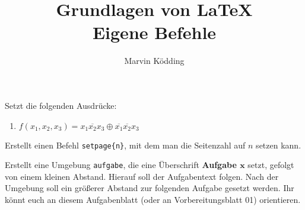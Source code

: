 \documentclass[a4paper, 12pt]{mksheetphhd}
\title{Grundlagen von \LaTeX\\\small Eigene Befehle}
\author{Marvin Ködding}
\begin{document}
	\printtitle
	
	\vspace*{.5cm}
	
	\begin{aufgabe}
		Setzt die folgenden Ausdrücke:
		\begin{enumerate}
				\item $f(x_1, x_2, x_3) = x_1\overline{x_2}x_3 \oplus \overline{x_1}\overline{x_2}x_3$
			
		\end{enumerate}
	\end{aufgabe}
	
	\begin{aufgabe}
		Erstellt einen Befehl \verb|setpage{n}|, mit dem man die Seitenzahl auf $n$ setzen kann.
	\end{aufgabe}
	
	\begin{aufgabe}
		Erstellt eine Umgebung \verb|aufgabe|, die eine Überschrift \textbf{Aufgabe $\mathbf{x}$} setzt, gefolgt von einem kleinen Abstand. Hierauf soll der Aufgabentext folgen. Nach der Umgebung soll ein größerer Abstand zur folgenden Aufgabe gesetzt werden. Ihr könnt euch an diesem Aufgabenblatt (oder an Vorbereitungsblatt 01) orientieren.
	\end{aufgabe}
	
	
\end{document}
